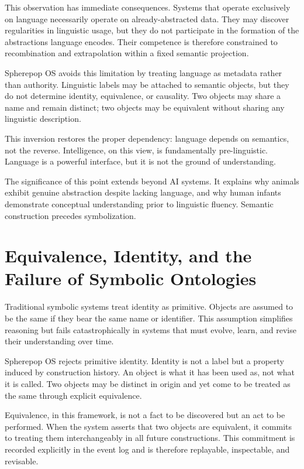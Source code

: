 \documentclass[11pt]{article}
\begin{document}
This observation has immediate consequences. Systems that operate
exclusively on language necessarily operate on already-abstracted data.
They may discover regularities in linguistic usage, but they do not
participate in the formation of the abstractions language encodes. Their
competence is therefore constrained to recombination and extrapolation
within a fixed semantic projection.

Spherepop OS avoids this limitation by treating language as metadata rather
than authority. Linguistic labels may be attached to semantic objects, but
they do not determine identity, equivalence, or causality. Two objects may
share a name and remain distinct; two objects may be equivalent without
sharing any linguistic description.

This inversion restores the proper dependency: language depends on
semantics, not the reverse. Intelligence, on this view, is fundamentally
pre-linguistic. Language is a powerful interface, but it is not the ground
of understanding.

The significance of this point extends beyond AI systems. It explains why
animals exhibit genuine abstraction despite lacking language, and why
human infants demonstrate conceptual understanding prior to linguistic
fluency. Semantic construction precedes symbolization.

\section{Equivalence, Identity, and the Failure of Symbolic Ontologies}

Traditional symbolic systems treat identity as primitive. Objects are
assumed to be the same if they bear the same name or identifier. This
assumption simplifies reasoning but fails catastrophically in systems that
must evolve, learn, and revise their understanding over time.

Spherepop OS rejects primitive identity. Identity is not a label but a
property induced by construction history. An object is what it has been
used as, not what it is called. Two objects may be distinct in origin and
yet come to be treated as the same through explicit equivalence.

Equivalence, in this framework, is not a fact to be discovered but an act
to be performed. When the system asserts that two objects are equivalent,
it commits to treating them interchangeably in all future constructions.
This commitment is recorded explicitly in the event log and is therefore
replayable, inspectable, and revisable.
\end{document}
